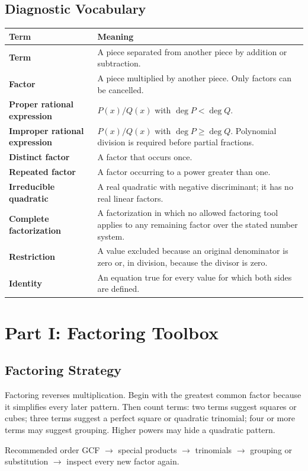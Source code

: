 \documentclass[11pt,oneside]{book}
\begin{document}
\chapter*{Diagnostic Vocabulary}
\begin{longtable}{>{\bfseries}p{}p{}}
Term & Meaning\\\toprule
Term & A piece separated from another piece by addition or subtraction.\\
Factor & A piece multiplied by another piece. Only factors can be cancelled.\\
Proper rational expression & $P(x)/Q(x)$ with $\deg P<\deg Q$.\\
Improper rational expression & $P(x)/Q(x)$ with $\deg P\ge\deg Q$. Polynomial division is required before partial fractions.\\
Distinct factor & A factor that occurs once.\\
Repeated factor & A factor occurring to a power greater than one.\\
Irreducible quadratic & A real quadratic with negative discriminant; it has no real linear factors.\\
Complete factorization & A factorization in which no allowed factoring tool applies to any remaining factor over the stated number system.\\
Restriction & A value excluded because an original denominator is zero or, in division, because the divisor is zero.\\
Identity & An equation true for every value for which both sides are defined.\\
\end{longtable}
\mainmatter

\part{Part I: Factoring Toolbox}
\chapter*{Factoring Strategy}
Factoring reverses multiplication. Begin with the greatest common factor because it simplifies every later pattern. Then count terms: two terms suggest squares or cubes; three terms suggest a perfect square or quadratic trinomial; four or more terms may suggest grouping. Higher powers may hide a quadratic pattern.
\begin{rulebox}{Recommended order}
GCF $\longrightarrow$ special products $\longrightarrow$ trinomials $\longrightarrow$ grouping or substitution $\longrightarrow$ inspect every new factor again.
\end{rulebox}
\end{document}
